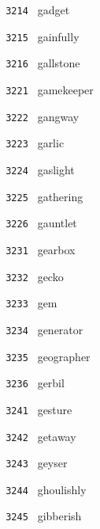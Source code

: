 \documentclass[11pt]{article}
\begin{document}
\begin{multicols}{6}
\noindent \texttt{ 3214 } \hspace{1mm} gadget  \par
\noindent \texttt{ 3215 } \hspace{1mm} gainfully  \par
\noindent \texttt{ 3216 } \hspace{1mm} gallstone  \par
\noindent \texttt{ 3221 } \hspace{1mm} gamekeeper  \par
\noindent \texttt{ 3222 } \hspace{1mm} gangway  \par
\noindent \texttt{ 3223 } \hspace{1mm} garlic  \par
\noindent \texttt{ 3224 } \hspace{1mm} gaslight  \par
\noindent \texttt{ 3225 } \hspace{1mm} gathering  \par
\noindent \texttt{ 3226 } \hspace{1mm} gauntlet  \par
\noindent \texttt{ 3231 } \hspace{1mm} gearbox  \par
\noindent \texttt{ 3232 } \hspace{1mm} gecko  \par
\noindent \texttt{ 3233 } \hspace{1mm} gem  \par
\noindent \texttt{ 3234 } \hspace{1mm} generator  \par
\noindent \texttt{ 3235 } \hspace{1mm} geographer  \par
\noindent \texttt{ 3236 } \hspace{1mm} gerbil  \par
\noindent \texttt{ 3241 } \hspace{1mm} gesture  \par
\noindent \texttt{ 3242 } \hspace{1mm} getaway  \par
\noindent \texttt{ 3243 } \hspace{1mm} geyser  \par
\noindent \texttt{ 3244 } \hspace{1mm} ghoulishly  \par
\noindent \texttt{ 3245 } \hspace{1mm} gibberish  \par

\end{multicols}
\end{document}
